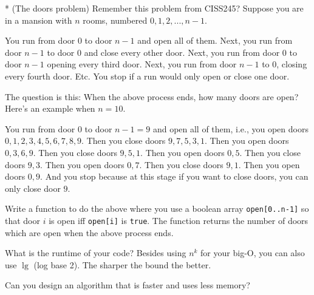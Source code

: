 * (The doors problem)
Remember this problem from CISS245?
Suppose you are in a mansion with $n$ rooms,
numbered $0, 1, 2, ..., n - 1$.
\begin{enumerate}[nosep]
\li You run from door $0$ to door $n - 1$ and open all of them.
\li Next, you run from door $n - 1$ to door $0$ and close every
other door.
\li Next, you run from door $0$ to door $n - 1$
opening every third door.
\li Next, you run from door $n - 1$ to $0$,
closing every fourth door.
\li Etc. You stop if a run would only open or close one door.
\end{enumerate}
The question is this: When the above process ends, how
many doors are open?
Here’s an example when $n = 10$.
\begin{enumerate}[nosep]
\li You run from door $0$ to door $n - 1 = 9$ and open all of
them, i.e., you open doors $0, 1, 2, 3, 4, 5, 6, 7, 8, 9$.
\li Then you close doors $9, 7, 5, 3, 1$.
\li Then you open doors $0, 3, 6, 9$.
\li Then you close doors $9, 5, 1$.
\li Then you open doors $0, 5$.
\li Then you close doors $9, 3$.
\li Then you open doors $0, 7$.
\li Then you close doors $9, 1$.
\li Then you open doors $0, 9$.
\li And you stop because at this stage if you want to close doors,
you can only close door $9$.
\end{enumerate}
Write a function to do the above where
you use a boolean array \verb!open[0..n-1]! so that
door $i$ is open iff \verb!open[i]! is \verb!true!.
The function returns the number of doors which are open when the above
process ends.
\begin{myenum}
\item
What is the runtime of your code?
Besides using $n^k$ for your big-O, you can
also use $\lg$ (log base 2).
The sharper the bound the better.
\item
Can you design an algorithm that is faster and uses less memory?
\end{myenum}
